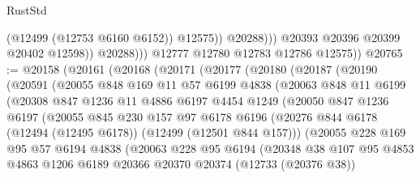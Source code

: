 \begin{lexlean}{RustStd}
\begin{coremodule}
                            (@12499 (@12753 @6160 @6152))
                            @12575))
                        @20288)))
                  @20393
                  @20396
                  @20399
                  @20402
                  @12598))
              @20288)))
        @12777
        @12780
        @12783
        @12786
        @12575))
@20765 := @20158
    (@20161
      (@20168
        (@20171
          (@20177
            (@20180
              (@20187
                (@20190
                  (@20591
                    (@20055
                      @848
                      @169
                      @11
                      @57
                      @6199
                      @4838
                      (@20063
                        @848
                        @11
                        @6199
                        (@20308
                          @847
                          @1236
                          @11
                          @4886
                          @6197
                          @4454
                          @1249
                          (@20050
                            @847
                            @1236
                            @6197
                            (@20055
                              @845
                              @230
                              @157
                              @97
                              @6178
                              @6196
                              (@20276
                                @844
                                @6178
                                (@12494 (@12495 @6178))
                                (@12499 (@12501 @844 @157)))
                              (@20055
                                @228
                                @169
                                @95
                                @57
                                @6194
                                @4838
                                (@20063
                                  @228
                                  @95
                                  @6194
                                  (@20348
                                    @38
                                    @107
                                    @95
                                    @4853
                                    @4863
                                    @1206
                                    @6189
                                    @20366
                                    @20370
                                    @20374
                                    (@12733 (@20376 @38))

\end{coremodule}
\end{lexlean}
